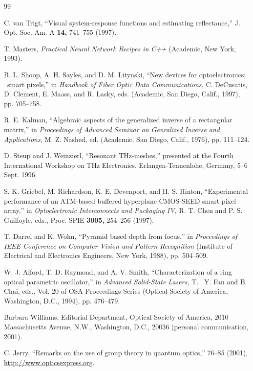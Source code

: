 \documentclass[letterpaper,12pt]{article}   %
\begin{document}


\begin{thebibliography}{99}

C. van Trigt, ``Visual system-response functions and estimating reflectance,'' %
J. Opt. Soc. Am. A {\bf 14,} 741--755 (1997).

T. Masters, {\it Practical Neural Network Recipes in C++} (Academic,
New York, 1993).

B. L. Shoop, A. H. Sayles, and D. M. Litynski, ``New devices for
optoelectronics:  \ smart pixels,'' in {\it Handbook of Fiber
Optic Data Communications,} C. DeCusatis, D. Clement, E. Maass,
and R. Lasky, eds. (Academic, San Diego, Calif., 1997), pp.
705--758.

R. E. Kalman, ``Algebraic aspects of the generalized inverse of a
rectangular matrix,'' in {\it Proceedings of Advanced Seminar on
Genralized Inverse and Applications,} M. Z. Nashed, ed. (Academic,
San Diego, Calif., 1976), pp. 111--124.

D. Steup and J. Weinzierl, ``Resonant THz-meshes,'' presented at the
Fourth International Workshop on THz Electronics,
Erlangen-Tennenlohe, Germany, 5--6 Sept. 1996.

 S. K. Griebel, M. Richardson, K. E. Devenport, and H. S. Hinton,
``Experimental performance of an ATM-based buffered hyperplane
CMOS-SEED smart pixel array,'' in {\it Optoelectronic
Interconnects and Packaging IV,} R. T. Chen and P. S. Guilfoyle,
eds., Proc. SPIE {\bf 3005,} 254--256 (1997).

T. Darrel and K. Wohn, ``Pyramid based depth from focus,'' in
{\it Proceedings of IEEE Conference on Computer Vision and Pattern
Recognition} (Institute of Electrical and Electronics Engineers,
New York, 1988), pp. 504--509.

 W. J. Alford, T. D. Raymond, and A. V. Smith, ``Characterization of a ring optical
parametric oscillator,'' in {\it Advanced Solid-State Lasers,} T.~
Y. Fan and B. Chai, eds., Vol. 20 of OSA Proceedings Series
(Optical Society of America, Washington, D.C., 1994), pp.
476--479.

Barbara Williams, Editorial Department, Optical Society of
America, 2010 Massa\-chusetts Avenue, N.W., Washington, D.C.,
20036 (personal communication, 2001).

C. Jerry, ``Remarks on the use of group
theory in quantum optics,''  76--85 (2001),
\href{http://www.opticsexpress.org}{http://www.opticsexpress.org}.

\end{thebibliography}
\end{document}
